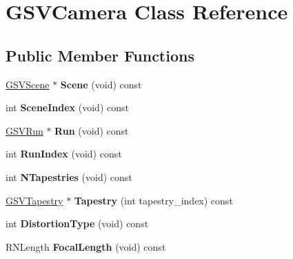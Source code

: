\hypertarget{class_g_s_v_camera}{}\section{G\+S\+V\+Camera Class Reference}
\label{class_g_s_v_camera}
\subsection*{Public Member Functions}
\begin{DoxyCompactItemize}
\item 
\hyperlink{class_g_s_v_scene}{G\+S\+V\+Scene} $\ast$ {\bfseries Scene} (void) const \hypertarget{class_g_s_v_camera_a391b6e25b39c17cfc9d202d63efc3fe6}{}\label{class_g_s_v_camera_a391b6e25b39c17cfc9d202d63efc3fe6}

\item 
int {\bfseries Scene\+Index} (void) const \hypertarget{class_g_s_v_camera_aa42750a3b159251523e34e16a2b0282a}{}\label{class_g_s_v_camera_aa42750a3b159251523e34e16a2b0282a}

\item 
\hyperlink{class_g_s_v_run}{G\+S\+V\+Run} $\ast$ {\bfseries Run} (void) const \hypertarget{class_g_s_v_camera_a2ccc7d7833e8a15655043e94abd55aa6}{}\label{class_g_s_v_camera_a2ccc7d7833e8a15655043e94abd55aa6}

\item 
int {\bfseries Run\+Index} (void) const \hypertarget{class_g_s_v_camera_a1866d56119aab49184083bf322763399}{}\label{class_g_s_v_camera_a1866d56119aab49184083bf322763399}

\item 
int {\bfseries N\+Tapestries} (void) const \hypertarget{class_g_s_v_camera_a472ed867913645d6e59652b76b5e2a21}{}\label{class_g_s_v_camera_a472ed867913645d6e59652b76b5e2a21}

\item 
\hyperlink{class_g_s_v_tapestry}{G\+S\+V\+Tapestry} $\ast$ {\bfseries Tapestry} (int tapestry\+\_\+index) const \hypertarget{class_g_s_v_camera_a3da686c762202ea7b0bf0954ba635a9d}{}\label{class_g_s_v_camera_a3da686c762202ea7b0bf0954ba635a9d}

\item 
int {\bfseries Distortion\+Type} (void) const \hypertarget{class_g_s_v_camera_a8c4af06a19f908494221eb66519d17bf}{}\label{class_g_s_v_camera_a8c4af06a19f908494221eb66519d17bf}

\item 
R\+N\+Length {\bfseries Focal\+Length} (void) const \hypertarget{class_g_s_v_camera_a58e3c9f3fc718057996453cc9ffce9e6}{}\label{class_g_s_v_camera_a58e3c9f3fc718057996453cc9ffce9e6}


\end{DoxyCompactItemize}

